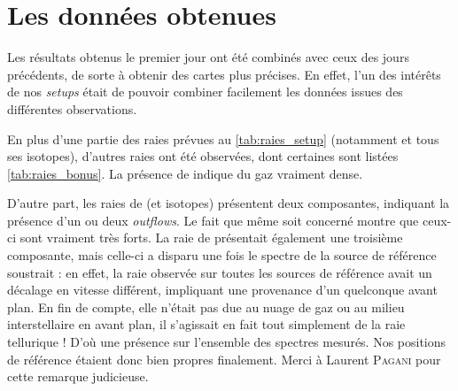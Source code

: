 \documentclass[a4paper,10pt,french]{article}
\begin{document}
\section{Les données obtenues}
\label{sec:resultats}

Les résultats obtenus le premier jour ont été combinés avec ceux des jours
précédents, de sorte à obtenir des cartes plus précises. En effet, l’un des
intérêts de nos \textit{setups} était de pouvoir combiner facilement les
données issues des différentes observations.

En plus d’une partie des raies prévues au \cref{tab:raies_setup} (notamment
 et tous ses isotopes), d’autres raies ont été observées, dont certaines
sont listées \cref{tab:raies_bonus}. La présence de  indique du gaz
vraiment dense.

D’autre part, les raies de  (et isotopes) présentent deux composantes,
indiquant la présence d’un ou deux \textit{outflows}. Le fait que même
 soit concerné montre que ceux-ci sont vraiment très forts. La raie
de  présentait également une troisième composante, mais celle-ci a
disparu une fois le spectre de la source de référence soustrait : en effet, la
raie observée sur toutes les sources de référence avait un décalage en vitesse
différent, impliquant une provenance d’un quelconque avant plan. En fin de
compte, elle n’était pas due au nuage de gaz ou au milieu interstellaire en
avant plan, il s’agissait en fait tout simplement de la raie tellurique ! D’où
une présence sur l’ensemble des spectres mesurés. Nos positions de référence
étaient donc bien propres finalement. Merci à Laurent \textsc{Pagani} pour
cette remarque judicieuse.
\end{document}
